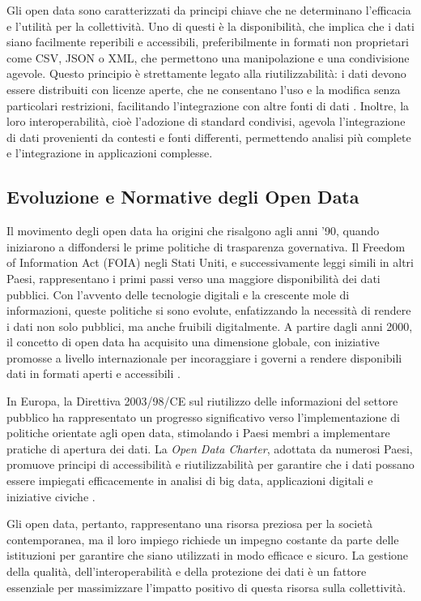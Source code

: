 Gli open data sono caratterizzati da principi chiave che ne determinano l’efficacia e l’utilità per la collettività. Uno di questi è la disponibilità, che implica che i dati siano facilmente reperibili e accessibili, preferibilmente in formati non proprietari come CSV, JSON o XML, che permettono una manipolazione e una condivisione agevole. Questo principio è strettamente legato alla riutilizzabilità: i dati devono essere distribuiti con licenze aperte, che ne consentano l’uso e la modifica senza particolari restrizioni, facilitando l’integrazione con altre fonti di dati \cite{Kitchin2014}. Inoltre, la loro interoperabilità, cioè l’adozione di standard condivisi, agevola l’integrazione di dati provenienti da contesti e fonti differenti, permettendo analisi più complete e l’integrazione in applicazioni complesse.

\subsection{Evoluzione e Normative degli Open Data}

Il movimento degli open data ha origini che risalgono agli anni ’90, quando iniziarono a diffondersi le prime politiche di trasparenza governativa. Il Freedom of Information Act (FOIA) negli Stati Uniti, e successivamente leggi simili in altri Paesi, rappresentano i primi passi verso una maggiore disponibilità dei dati pubblici. Con l’avvento delle tecnologie digitali e la crescente mole di informazioni, queste politiche si sono evolute, enfatizzando la necessità di rendere i dati non solo pubblici, ma anche fruibili digitalmente. A partire dagli anni 2000, il concetto di open data ha acquisito una dimensione globale, con iniziative promosse a livello internazionale per incoraggiare i governi a rendere disponibili dati in formati aperti e accessibili \cite{OpenDataHandbook}.

In Europa, la Direttiva 2003/98/CE sul riutilizzo delle informazioni del settore pubblico ha rappresentato un progresso significativo verso l’implementazione di politiche orientate agli open data, stimolando i Paesi membri a implementare pratiche di apertura dei dati. La \textit{Open Data Charter}, adottata da numerosi Paesi, promuove principi di accessibilità e riutilizzabilità per garantire che i dati possano essere impiegati efficacemente in analisi di big data, applicazioni digitali e iniziative civiche \cite{OpenDataCharter}.

Gli open data, pertanto, rappresentano una risorsa preziosa per la società contemporanea, ma il loro impiego richiede un impegno costante da parte delle istituzioni per garantire che siano utilizzati in modo efficace e sicuro. La gestione della qualità, dell’interoperabilità e della protezione dei dati è un fattore essenziale per massimizzare l'impatto positivo di questa risorsa sulla collettività.



